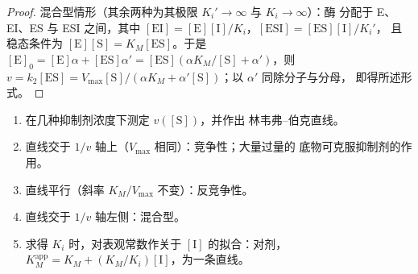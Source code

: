 \begin{proof}
混合型情形（其余两种为其极限 $K_i' \to \infty$ 与 $K_i \to \infty$）：酶
分配于 E、EI、ES 与 ESI 之间，其中 $[\mathrm{EI}] = [\mathrm E][\mathrm I]/K_i$，$[\mathrm{ESI}] = [\mathrm{ES}][\mathrm I]/K_i'$，
且稳态条件为 $[\mathrm E][\mathrm S] = K_M[\mathrm{ES}]$。于是 $[\mathrm E]_0 = [\mathrm E]\alpha + [\mathrm{ES}]\alpha' =
[\mathrm{ES}](\alpha K_M/[\mathrm S] + \alpha')$，则 $v = k_2[\mathrm{ES}] = V_{\max}[\mathrm S]/(\alpha K_M + \alpha'[\mathrm S])$；以 $\alpha'$ 同除分子与分母，
即得所述形式。
\end{proof}

\begin{method}[判别抑制的类型]\label{met:b3:complex-kinetics:inhibition-type}
\begin{enumerate}
  \item 在几种抑制剂浓度下测定 $v([\mathrm S])$，并作出
        林韦弗–伯克直线。
  \item 直线交于 $1/v$ 轴上（$V_{\max}$ 相同）：竞争性；大量过量的
        底物可克服抑制剂的作用。
  \item 直线平行（斜率 $K_M/V_{\max}$ 不变）：反竞争性。
  \item 直线交于 $1/v$ 轴左侧：混合型。
  \item 求得 $K_i$ 时，对表观常数作关于 $[\mathrm I]$ 的拟合：对剂，
        $K_M^{\mathrm{app}} = K_M + (K_M/K_i)[\mathrm I]$，为一条直线。
\end{enumerate}
\end{method}

